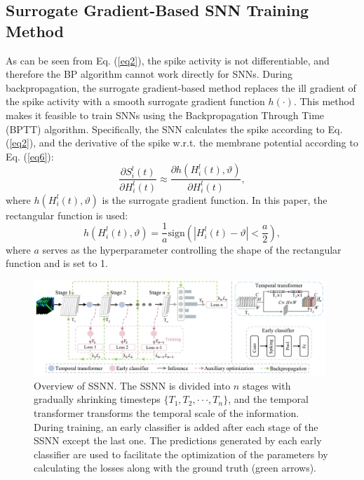\documentclass[letterpaper]{article} %
\begin{document}
\subsection{Surrogate Gradient-Based SNN Training Method}
As can be seen from Eq. (\ref{eq2}), the spike activity is not differentiable, and therefore the BP algorithm cannot work directly for SNNs. During backpropagation, the surrogate gradient-based method replaces the ill gradient of the spike activity with a smooth surrogate gradient function $h(\cdot)$. This method makes it feasible to train SNNs using the Backpropagation Through Time (BPTT) algorithm.
Specifically, the SNN calculates the spike according to Eq. (\ref{eq2}), and the derivative of the spike w.r.t. the membrane potential according to Eq. (\ref{eq6}):
\begin{equation}
\frac{\partial S_{i}^{l}(t)}{\partial H_{i}^{l}(t)} \approx \frac{\partial h(H_{i}^{l}(t), \vartheta)}{\partial H_{i}^{l}(t)},
\label{eq6}
\end{equation}
where $h(H_{i}^{l}(t),\vartheta)$ is the surrogate gradient function. In this paper, the rectangular function \cite{STBP} is used:
\begin{equation}
h(H_{i}^{l}(t),\vartheta) = \frac{1}{a} \text{sign}(|H_{i}^{l}(t)-\vartheta|<\frac{a}{2}),
\label{eq7}
\end{equation}
where $a$ serves as the hyperparameter controlling the shape of the rectangular function and is set to 1.
\begin{figure}[t]
\centering
\includegraphics[width=0.98\textwidth]{TSAC} %
\caption{Overview of SSNN. The SSNN is divided into $n$ stages with gradually shrinking timesteps $\{T_1,T_2,\cdot \cdot \cdot, T_n\}$, and the temporal transformer transforms the temporal scale of the information. During training, an early classifier is added after each stage of the SSNN except the last one. The predictions generated by each early classifier are used to facilitate the optimization of the parameters by calculating the losses along with the ground truth (green arrows).}
\label{TSAC}
\end{figure}
\end{document}
